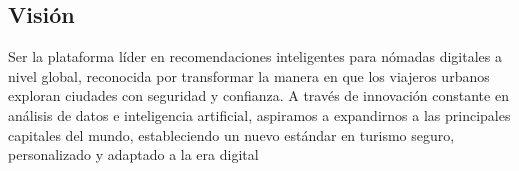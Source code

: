 \subsection{Visión}
Ser la plataforma líder en recomendaciones inteligentes para nómadas digitales a nivel global, reconocida por transformar la manera en que los viajeros urbanos exploran ciudades con seguridad y confianza. A través de innovación constante en análisis de datos e inteligencia artificial, aspiramos a expandirnos a las principales capitales del mundo, estableciendo un nuevo estándar en turismo seguro, personalizado y adaptado a la era digital
